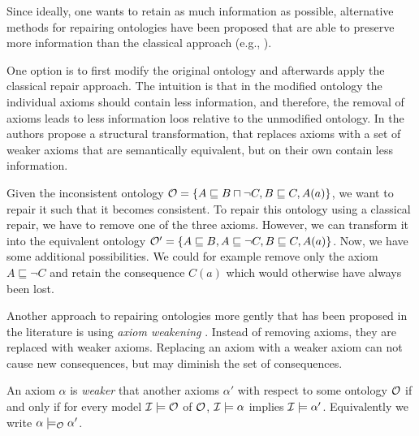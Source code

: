 Since ideally, one wants to retain as much information as possible, alternative methods for repairing ontologies have been proposed that are able to preserve more information than the classical approach (e.g., \cite{du2014practical,AMAI-2018,baader2018making,troquard2018repairing,confalonieri2020towards,horridge2008laconic,lam2008fine}).

One option is to first modify the original ontology and afterwards apply the classical repair approach. The intuition is that in the modified ontology the individual axioms should contain less information, and therefore, the removal of axioms leads to less information loos relative to the unmodified ontology. In \cite{horridge2008laconic} the authors propose a structural transformation, that replaces axioms with a set of weaker axioms that are semantically equivalent, but on their own contain less information.

\begin{example}
  Given the inconsistent ontology $\mathcal{O} = \{ A \sqsubseteq B \sqcap \lnot C, B \sqsubseteq C, A(a) \}$, we want to repair it such that it becomes consistent. To repair this ontology using a classical repair, we have to remove one of the three axioms. However, we can transform it into the equivalent ontology $\mathcal{O}' = \{ A \sqsubseteq B, A \sqsubseteq \lnot C, B \sqsubseteq C, A(a) \}$. Now, we have some additional possibilities. We could for example remove only the axiom $A \sqsubseteq \lnot C$ and retain the consequence $C(a)$ which would otherwise have always been lost.
\end{example}

Another approach to repairing ontologies more gently that has been proposed in the literature is using \emph{axiom weakening} \cite{troquard2018repairing,confalonieri2020towards,confalonieri2022irresistible,baader2018making,lam2008fine}. Instead of removing axioms, they are replaced with weaker axioms. Replacing an axiom with a weaker axiom can not cause new consequences, but may diminish the set of consequences.

\begin{definition}
  An axiom $\alpha$ is \emph{weaker} that another axioms $\alpha'$ with respect to some ontology $\mathcal{O}$ if and only if for every model $\mathcal{I} \models \mathcal{O}$ of $\mathcal{O}$, $\mathcal{I} \models \alpha$ implies $\mathcal{I} \models \alpha'$. Equivalently we write $\alpha \models_\mathcal{O} \alpha'$.
\end{definition}

